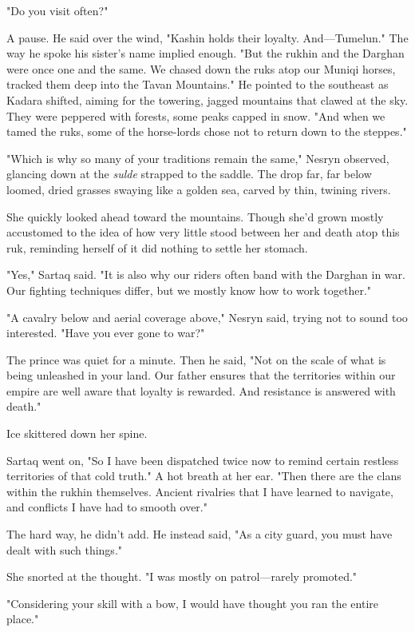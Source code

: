 "Do you visit often?"

A pause. He said over the wind, "Kashin holds their loyalty. And---Tumelun." The way he spoke his sister's name implied enough. "But the rukhin and the Darghan were once one and the same. We chased down the ruks atop our Muniqi horses, tracked them deep into the Tavan Mountains." He pointed to the southeast as Kadara shifted, aiming for the towering, jagged mountains that clawed at the sky. They were peppered with forests, some peaks capped in snow. "And when we tamed the ruks, some of the horse-lords chose not to return down to the steppes."

"Which is why so many of your traditions remain the same," Nesryn observed, glancing down at the \emph{sulde} strapped to the saddle. The drop far, far below loomed, dried grasses swaying like a golden sea, carved by thin, twining rivers.

She quickly looked ahead toward the mountains. Though she'd grown mostly accustomed to the idea of how very little stood between her and death atop this ruk, reminding herself of it did nothing to settle her stomach.

"Yes," Sartaq said. "It is also why our riders often band with the Darghan in war. Our fighting techniques differ, but we mostly know how to work together."

"A cavalry below and aerial coverage above," Nesryn said, trying not to sound too interested. "Have you ever gone to war?"

The prince was quiet for a minute. Then he said, "Not on the scale of what is being unleashed in your land. Our father ensures that the territories within our empire are well aware that loyalty is rewarded. And resistance is answered with death."

Ice skittered down her spine.

Sartaq went on, "So I have been dispatched twice now to remind certain restless territories of that cold truth." A hot breath at her ear. "Then there are the clans within the rukhin themselves. Ancient rivalries that I have learned to navigate, and conflicts I have had to smooth over."

The hard way, he didn't add. He instead said, "As a city guard, you must have dealt with such things."

She snorted at the thought. "I was mostly on patrol---rarely promoted."

"Considering your skill with a bow, I would have thought you ran the entire place."

